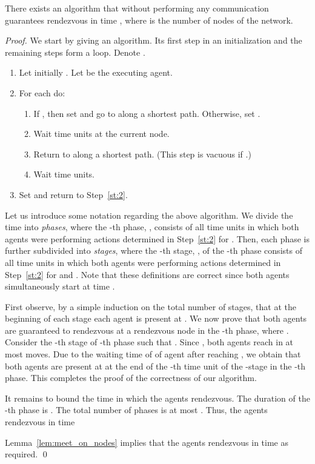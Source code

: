 \documentclass{llncs}
\begin{document}
\begin{theorem} \label{thm:arbitrary+no-comm}
There exists an algorithm that without performing any communication guarantees rendezvous in time , where  is the number of nodes of the network.
\end{theorem}
\begin{proof}
We start by giving an algorithm.
Its first step in an initialization and the remaining steps form a loop.
Denote .
\begin{enumerate}
 \item\label{st:1} Let initially . Let  be the executing agent.
 \item\label{st:2} For each  do:
   \begin{enumerate}[label={\normalfont \ref{st:2}.\arabic*.}]
    \item If , then set  and go to  along a shortest path. Otherwise, set .
    \item Wait  time units at the current node.
    \item Return to  along a shortest path. (This step is vacuous if .)
    \item Wait  time units.
   \end{enumerate}
 \item\label{st:3} Set  and return to Step~\ref{st:2}.
\end{enumerate}

Let us introduce some notation regarding the above algorithm.
We divide the time into \emph{phases}, where the -th phase, , consists of all time units in which both agents were performing actions determined in Step~\ref{st:2} for .
Then, each phase is further subdivided into \emph{stages}, where the -th stage, , of the -th phase consists of all time units in which both agents were performing actions determined in Step~\ref{st:2} for  and .
Note that these definitions are correct since both agents simultaneously start at time .

First observe, by a simple induction on the total number of stages, that at the beginning of each stage each agent  is present at .
We now prove that both agents are guaranteed to rendezvous at a rendezvous node  in the -th phase, where .
Consider the -th stage of -th phase such that .
Since , both agents reach  in at most  moves.
Due to the waiting time of  of agent  after reaching , we obtain that both agents are present at  at the end of the -th time unit of the -stage in the -th phase.
This completes the proof of the correctness of our algorithm.

It remains to bound the time in which the agents rendezvous.
The duration of the -th phase is .
The total number of phases is at most .
Thus, the agents rendezvous in time

Lemma~\ref{lem:meet_on_nodes} implies that the agents rendezvous in time  as required.
\qed
\end{proof}
\end{document}
